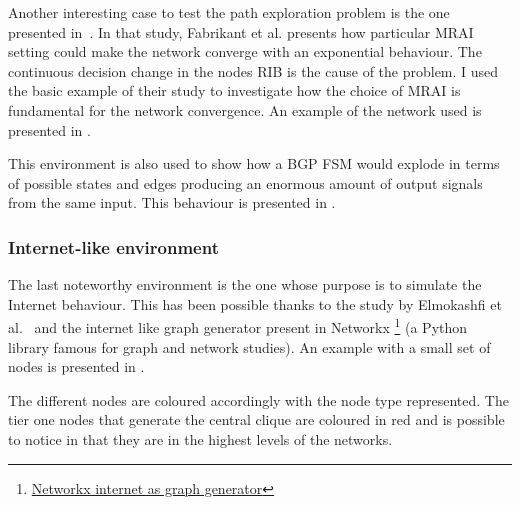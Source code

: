 Another interesting case to test the path exploration problem is the one
presented in~\cite{fabrikant2011there}.
In that study, Fabrikant et al. presents how particular \ac{MRAI} setting could
make the network converge with an exponential behaviour. The continuous decision
change in the nodes \ac{RIB} is the cause of the problem.
I used the basic example of their study to investigate how the choice of \ac{MRAI}
is fundamental for the network convergence.
An example of the network used is presented in .


This environment is also used to show how a \ac{BGP} \ac{FSM} would explode
in terms of possible states and edges producing an enormous amount of
output signals from the same input.
This behaviour is presented in .

\subsubsection{Internet-like environment}
\label{subsec:internet_like_env}

The last noteworthy environment is the one whose purpose is to simulate the Internet
behaviour.
This has been possible thanks to the study by Elmokashfi et al.~\cite{elmokashfi2010scalability}
and the internet like graph generator present in Networkx \footnote{\href{https://networkx.org/documentation/stable/reference/generated/networkx.generators.internet_as_graphs.random_internet_as_graph.html\#networkx.generators.internet_as_graphs.random_internet_as_graph}{Networkx internet as graph generator}}
(a Python library famous for graph and network studies).
An example with a small set of nodes is presented in .

The different nodes are coloured accordingly with the node type represented.
The tier one nodes that generate the central clique are coloured in red and
is possible to notice in  that they are
in the highest levels of the networks.

